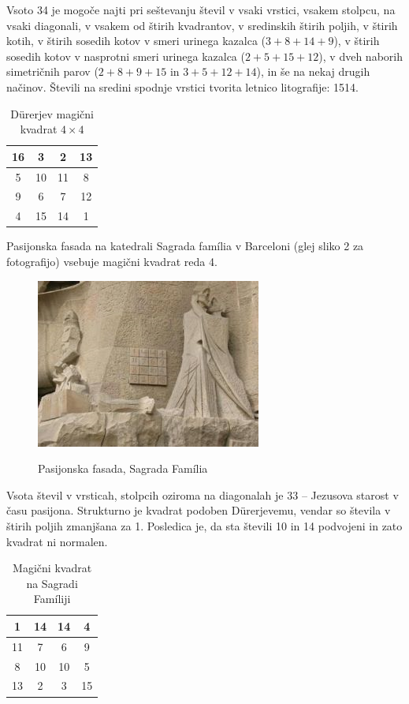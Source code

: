 \documentclass[a4paper,12pt]{article}
\begin{document}
Vsoto 34 je mogoče najti pri seštevanju števil v vsaki vrstici, vsakem stolpcu,
na vsaki diagonali, v vsakem od štirih kvadrantov, v sredinskih štirih poljih,
v štirih kotih, v štirih sosedih kotov v smeri urinega kazalca ($3+8+14+9$), v
štirih sosedih kotov v nasprotni smeri urinega kazalca ($2+5+15+12$), v dveh naborih
simetričnih parov ($2+8+9+15$ in $3+5+12+14$), in še na nekaj drugih načinov.
Števili na sredini spodnje vrstici tvorita letnico litografije: 1514.

\begin{table}[h]
   \centering
   \large
   \caption{Dürerjev magični kvadrat $4\times 4$}
   \begin{tabular}{|c|c|c|c|}
      \hline
       16 &  3 &  2 & 13 \\\hline
       5 & 10 & 11 &  8 \\\hline
       9 &  6 &  7 & 12 \\\hline
       4 & 15 & 14 &  1 \\\hline
   \end{tabular}
   \label{table:durer}
\end{table}
Pasijonska fasada na katedrali Sagrada família v Barceloni
(glej sliko 2 za fotografijo) vsebuje magični kvadrat reda 4.

\begin{figure}[!ht]
   \centering
   \caption{Pasijonska fasada, Sagrada Família}
   \includegraphics[scale=0.45]{sagrada.png} 
   \label{fig:sagrada}  
\end{figure}


Vsota števil v vrsticah, stolpcih oziroma na diagonalah je 33 -- Jezusova starost
v času pasijona. Strukturno je kvadrat podoben Dürerjevemu, vendar so števila
v štirih poljih zmanjšana za 1. Posledica je, da sta števili 10 in 14 podvojeni
in zato kvadrat ni normalen.

\begin{table}
   \centering
   \large
   \caption{Magični kvadrat na Sagradi Famíliji}
   \begin{tabular}{|c|c|c|c|}
      \hline
      1 & 14 & 14 &  4 \\\hline
      11 &  7 &  6 &  9 \\\hline
      8 & 10 & 10 &  5 \\\hline
      13 &  2 &  3 & 15 \\\hline
   \end{tabular}
   \label{table:sagrada}
\end{table}
\end{document}
